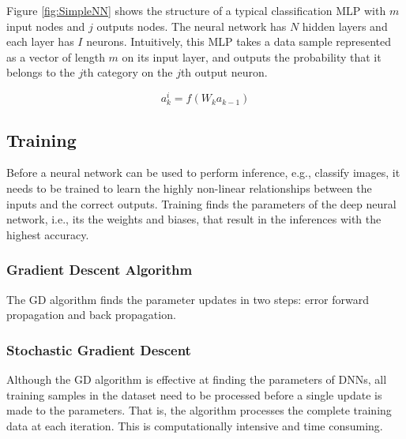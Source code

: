 \documentclass[letterpaper]{article}
\begin{document}
\begin{flushleft}
{Figure \ref{fig:SimpleNN} shows the structure of a typical classification MLP with $m$ input nodes and $j$ outputs nodes. The neural network
has $N$ hidden layers and each layer has $I$ neurons. Intuitively, this MLP takes a data sample represented as a vector of length
$m$ on its input layer, and outputs the probability that it belongs to the $j$th category on the $j$th output neuron.


\begin{equation}
a^i_k=f(W_k a_{k-1})
\end{equation}
\noindent

\bigskip

\subsection{Training}
Before a neural network can be used to perform inference, e.g., classify images, it needs to be trained to learn the highly non-linear
relationships between the inputs and the correct outputs. Training finds the 
parameters of the deep neural network, i.e., its the weights and biases, that result in the inferences with the highest accuracy.


\subsubsection{Gradient Descent Algorithm}
The GD algorithm finds the parameter updates in two steps: error forward propagation and back propagation. 

\subsubsection{Stochastic Gradient Descent}

Although the GD algorithm is effective at finding the parameters of DNNs, all  training samples in the dataset need to be processed
before a single update is made to the parameters. That is, the algorithm processes the complete training data at each iteration. 
This is computationally intensive and time consuming. 

}
\end{flushleft}
\end{document}
